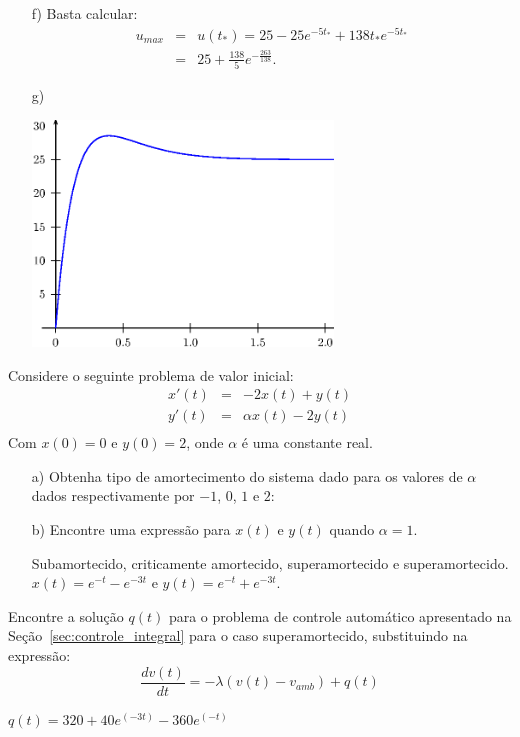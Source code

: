 \begin{resol}
\begin{itemize}
\item[f)] Basta calcular:
\begin{eqnarray*}
 u_{max}&=&u(t_\ast)= 25-25e^{-5t_\ast}+ 138 t_\ast e^{-5t_\ast}\\
&=&25+ \frac{138}{5} e^{-\frac{263}{138}}.
\end{eqnarray*}
\item[g)] 

\begin{center}\includegraphics[width=8cm]{cap_sistemas/pics/figura_7}\end{center}
\end{itemize}

\end{resol}

\begin{exer}
Considere o seguinte problema de valor inicial:
\begin{eqnarray*}
x'(t)&=&-2x(t) +  y(t)\\
y'(t)&=&\alpha x(t) - 2y(t)\\
\end{eqnarray*}
Com $x(0)=0$ e $y(0)=2$, onde $\alpha$ é uma constante real.
\begin{itemize}
 \item[a)] Obtenha tipo de amortecimento do sistema dado para os valores de $\alpha$ dados respectivamente por $-1$, $0$, $1$ e $2$:
 \item [b)] Encontre uma expressão para $x(t)$ e $y(t)$ quando $\alpha=1$. 
 
 Subamortecido, criticamente amortecido, superamortecido e superamortecido. $x(t)=e^{-t}-e^{-3t}$ e $y(t)=e^{-t}+e^{-3t}$.
\end{itemize}

\end{exer}

\begin{exer}
       Encontre a solução $q(t)$ para o problema de controle automático apresentado na Seção~\ref{sec:controle_integral} para o caso superamortecido, substituindo na expressão:
       \begin {equation}
        \frac {d v(t)}{dt}=-\lambda (v(t)-v_{amb}) + q(t)
      \end {equation}
\end{exer}
\begin{resp}
       $q(t)=320 + 40 e^(-3 t) - 360 e^(-t)$
\end{resp}

